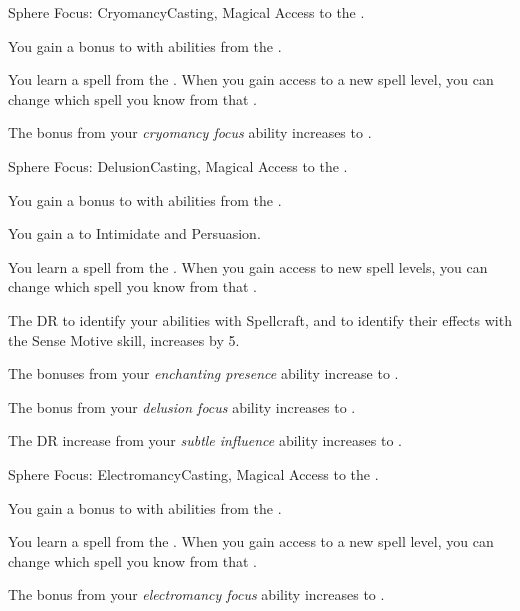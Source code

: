     \begin{feat}{Sphere Focus: Cryomancy}{Casting, Magical}
        \featpre Access to the  .

         You gain a  bonus to  with abilities from the  .

         You learn a spell from the  .
        When you gain access to a new spell level, you can change which spell you know from that .

         The bonus from your \textit{cryomancy focus} ability increases to .
    \end{feat}

    \begin{feat}{Sphere Focus: Delusion}{Casting, Magical}
        \featpre Access to the  .

         You gain a  bonus to  with abilities from the  .

         You gain a   to Intimidate and Persuasion.

         You learn a spell from the  .
        When you gain access to new spell levels, you can change which spell you know from that .

         The DR to identify your  abilities with Spellcraft, and to identify their effects with the Sense Motive skill, increases by 5.

         The bonuses from your \textit{enchanting presence} ability increase to .

         The bonus from your \textit{delusion focus} ability increases to .

         The DR increase from your \textit{subtle influence} ability increases to .
    \end{feat}

    \begin{feat}{Sphere Focus: Electromancy}{Casting, Magical}
        \featpre Access to the  .

         You gain a  bonus to  with abilities from the  .

         You learn a spell from the  .
        When you gain access to a new spell level, you can change which spell you know from that .

         The bonus from your \textit{electromancy focus} ability increases to .
    \end{feat}

